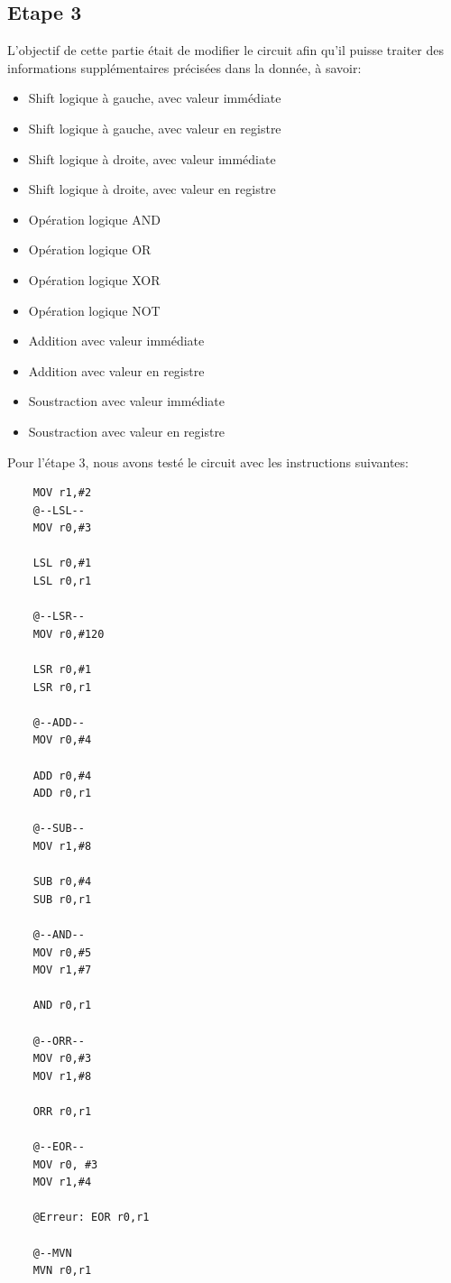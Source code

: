\documentclass[a4paper]{article} %
\begin{document}
\subsection{Etape 3}
L'objectif de cette partie était de modifier le circuit afin qu'il puisse traiter des informations supplémentaires précisées dans la donnée, à savoir:
\medskip

\begin{itemize}
    \item Shift logique à gauche, avec valeur immédiate
    \item Shift logique à gauche, avec valeur en registre
    \item Shift logique à droite, avec valeur immédiate
    \item Shift logique à droite, avec valeur en registre
    \item Opération logique AND
    \item Opération logique OR
    \item Opération logique XOR
    \item Opération logique NOT
    \item Addition avec valeur immédiate
    \item Addition avec valeur en registre
    \item Soustraction avec valeur immédiate
    \item Soustraction avec valeur en registre
\end{itemize}
\medskip
Pour l'étape 3, nous avons testé le circuit avec les instructions suivantes:
\begin{center}
    \begin{lstlisting}
    MOV r1,#2
    @--LSL--
    MOV r0,#3
    
    LSL r0,#1
    LSL r0,r1
    
    @--LSR--
    MOV r0,#120
    
    LSR r0,#1
    LSR r0,r1
    
    @--ADD--
    MOV r0,#4
    
    ADD r0,#4
    ADD r0,r1
    
    @--SUB--
    MOV r1,#8
    
    SUB r0,#4
    SUB r0,r1
    
    @--AND--
    MOV r0,#5
    MOV r1,#7
    
    AND r0,r1
    
    @--ORR--
    MOV r0,#3
    MOV r1,#8
    
    ORR r0,r1
    
    @--EOR--
    MOV r0, #3
    MOV r1,#4
    
    @Erreur: EOR r0,r1
    
    @--MVN
    MVN r0,r1
    \end{lstlisting}
\end{center}
\end{document}
